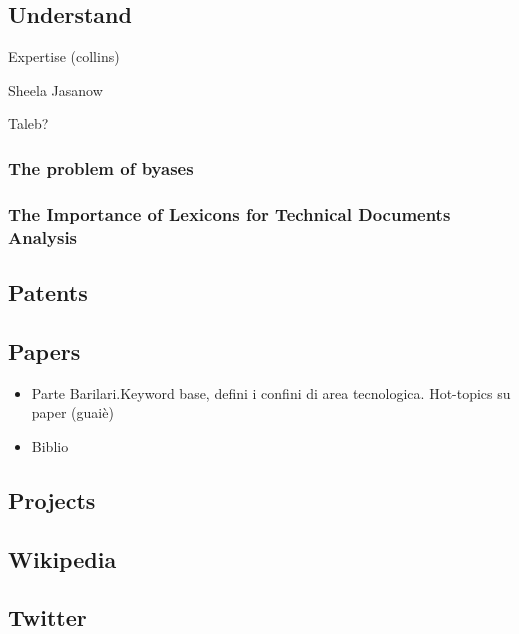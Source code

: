\documentclass[]{book}
\providecommand{\tightlist}{%
  \setlength{\itemsep}{0pt}\setlength{\parskip}{0pt}}
\begin{document}
\subsection{Understand}\label{sotadocumentsunderstand}

Expertise (collins)

Sheela Jasanow

Taleb?

\subsubsection{The problem of byases}\label{sotadocumentsunderstandbyas}

\subsubsection{The Importance of Lexicons for Technical Documents
Analysis}\label{sotadocumentsunderstandlexicons}

\subsection{Patents}\label{sotadocumentspatents}

\subsection{Papers}\label{sotadocumentspapers}

\begin{itemize}
\tightlist
\item
  Parte Barilari.Keyword base, defini i confini di area tecnologica.
  Hot-topics su paper (guaiè)
\item
  Biblio
\end{itemize}

\subsection{Projects}\label{sotadocumentsprojects}

\subsection{Wikipedia}\label{sotadocumentswiki}

\subsection{Twitter}\label{sotadocumentstwitter}
\end{document}

